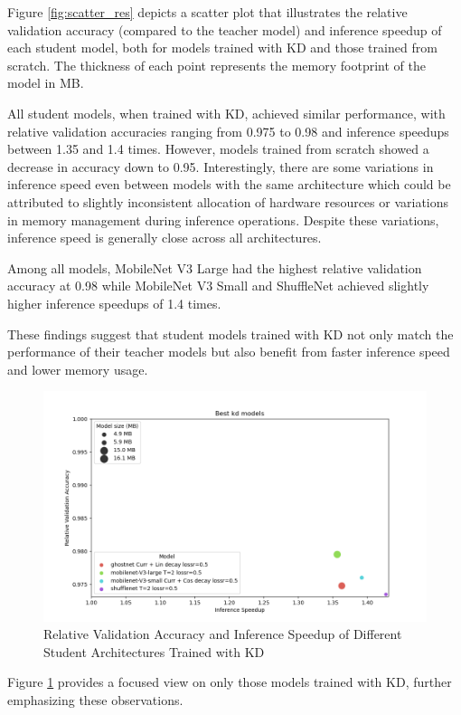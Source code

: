 \documentclass{article}
\begin{document}
Figure \ref{fig:scatter_res} depicts a scatter plot that illustrates the relative validation accuracy (compared to the teacher model) and inference speedup of each student model, both for models trained with KD and those trained from scratch. The thickness of each point represents the memory footprint of the model in MB.

All student models, when trained with KD, achieved similar performance, with relative validation accuracies ranging from 0.975 to 0.98 and inference speedups between 1.35 and 1.4 times. However, models trained from scratch showed a decrease in accuracy down to 0.95. Interestingly, there are some variations in inference speed even between models with the same architecture which could be attributed to slightly inconsistent allocation of hardware resources or variations in memory management during inference operations. Despite these variations, inference speed is generally close across all architectures.

Among all models, MobileNet V3 Large had the highest relative validation accuracy at 0.98 while MobileNet V3 Small and ShuffleNet achieved slightly higher inference speedups of 1.4 times.

These findings suggest that student models trained with KD not only match the performance of their teacher models but also benefit from faster inference speed and lower memory usage.

\begin{figure}
	\centering
	\includegraphics[width=0.9\linewidth]{assets/fat_plot_best KD}
	\caption{Relative Validation Accuracy and Inference Speedup of Different Student Architectures Trained with KD}
	\label{fig:scatter_kd_res}
\end{figure}

Figure \ref{fig:scatter_kd_res} provides a focused view on only those models trained with KD, further emphasizing these observations.
\end{document}

